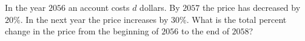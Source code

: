 In the year $2056$ an account costs $d$ dollars. By $2057$ the price has decreased by $20\%$. In the next year the price increases by $30\%$. What is the total percent change in the price from the beginning of $2056$ to the end of $2058$?
